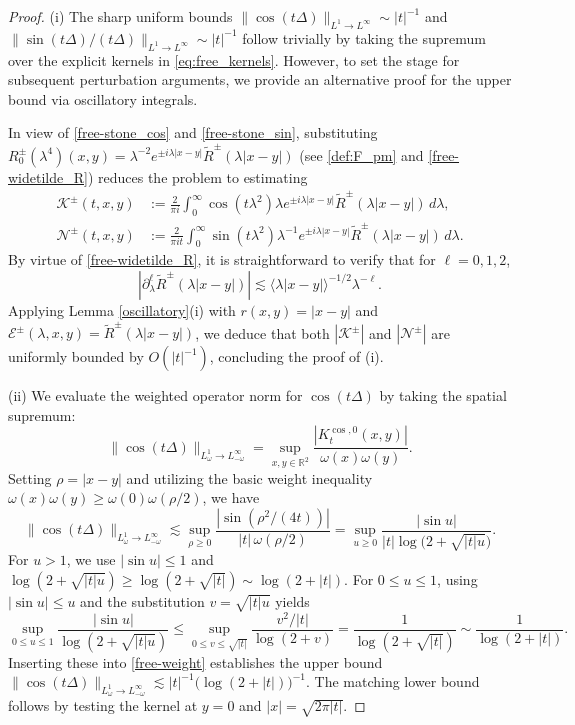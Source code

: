 \documentclass[reqno]{amsart}
\numberwithin{equation}{section}
\begin{document}
\begin{proof}
	(i) The sharp uniform bounds $\|\cos(t\Delta)\|_{L^1\to L^\infty}\sim|t|^{-1}$ and $\|\sin(t\Delta)/(t\Delta) \|_{L^1 \to L^{\infty}} \sim |t|^{-1}$ follow trivially by taking the supremum over the explicit kernels in \eqref{eq:free_kernels}. However, to set the stage for subsequent perturbation arguments, we provide an alternative proof for the upper bound via oscillatory integrals.
	
	In view of \eqref{free-stone_cos} and \eqref{free-stone_sin}, substituting $R^\pm_0(\lambda^4)(x,y) = \lambda^{-2}e^{\pm i\lambda|x-y|}\widetilde{R}^\pm(\lambda|x-y|)$ (see \eqref{def:F_pm} and \eqref{free-widetilde_R}) reduces the problem to estimating
	\begin{align*}
	\mathcal{K}^{ \pm}(t, x, y) &:= \frac{2}{\pi i}\int_0^{\infty} \cos(t \lambda^2) \lambda e^{\pm i\lambda|x-y|}\widetilde{R}^\pm(\lambda|x-y|) \, d\lambda, \\
	\mathcal{N}^{ \pm}(t, x, y) &:= \frac{2}{\pi i t}\int_0^{\infty} \sin (t \lambda^2) \lambda^{-1} e^{\pm i\lambda|x-y|}\widetilde{R}^\pm(\lambda|x-y|) \, d\lambda.
	\end{align*}
	By virtue of \eqref{free-widetilde_R}, it is straightforward to verify that for $\ell=0,1,2$,
	\[
	\left| \partial_\lambda^{\ell} \widetilde{R}^\pm(\lambda |x-y|) \right| \lesssim \langle \lambda |x-y| \rangle^{-1/2} \lambda^{-\ell}.
	\]
	Applying Lemma \ref{oscillatory}(i) with $r(x,y)=|x-y|$ and $\mathcal{E}^\pm(\lambda, x,y)=\widetilde{R}^\pm(\lambda|x-y|)$, we deduce that both $|\mathcal{K}^{\pm}|$ and $|\mathcal{N}^{\pm}|$ are uniformly bounded by ${O}(|t|^{-1})$, concluding the proof of (i).
	
	(ii) We evaluate the weighted operator norm for $\cos(t\Delta)$ by taking the spatial supremum:
	\begin{equation*}
	\|\cos(t\Delta)\|_{L^1_\omega\to L^\infty_{-\omega}} = \sup_{x,y\in\mathbb{R}^2} \frac{|K_t^{\cos,0}(x,y)|}{\omega(x)\omega(y)}.
	\end{equation*}
	Setting $\rho = |x-y|$ and utilizing the basic weight inequality $\omega(x)\omega(y) \ge \omega(0)\omega(\rho/2)$, we have
	\begin{equation}\label{free-weight}
	\|\cos(t\Delta)\|_{L^1_\omega\to L^\infty_{-\omega}}
	\lesssim \sup_{\rho \ge 0} \frac{|\sin(\rho^2/(4t))|}{|t|\,\omega(\rho/2)}
	= \sup_{u\ge 0} \frac{|\sin u|}{|t|\log\bigl(2+\sqrt{|t| u}\bigr)}.
	\end{equation}
	For $u>1$, we use $|\sin u|\le1$ and $\log(2+\sqrt{|t|u}) \ge \log(2 + \sqrt{|t|}) \sim \log (2 + |t|)$. For $0 \le u \le 1$, using $|\sin u|\le u$ and the substitution $v=\sqrt{|t|u}$ yields
	\[
	\sup_{0\le u\le 1} \frac{|\sin u|}{\log(2+\sqrt{|t|u})}
	\le \sup_{0\le v\le \sqrt{|t|}} \frac{v^2/|t|}{\log(2+v)} = \frac{1}{\log(2+\sqrt{|t|})} \sim \frac{1}{\log (2 + |t|)}.
	\]
	Inserting these into \eqref{free-weight} establishes the upper bound $\|\cos(t\Delta)\|_{L^1_\omega\to L^\infty_{-\omega}} \lesssim |t|^{-1}\bigl(\log (2 + |t|)\bigr)^{-1}$. The matching lower bound follows by testing the kernel at $y=0$ and $|x| = \sqrt{2\pi|t|}$.
	

\end{proof}
\end{document}

